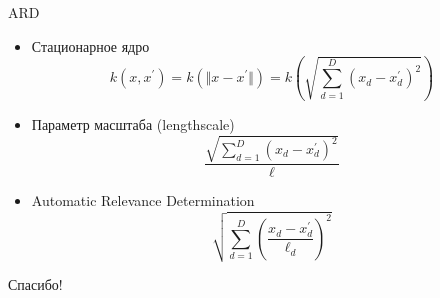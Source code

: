 \documentclass[fullscreen=true, bookmarks=true, hyperref={pdfencoding=unicode}]{beamer}
\begin{document}
\begin{frame}{}

\end{frame}

\begin{frame}{ARD}

    \begin{itemize}
        \item<1-> Стационарное ядро
        \[
        k(x, x^\prime) = k(\Vert x - x^\prime \Vert) = k\left(\sqrt{\sum_{d=1}^{D} (x_d - x^\prime_d)^2} \right)
        \]
        \item<2-> Параметр масштаба (lengthscale)
        \[
            \frac{\sqrt{\sum_{d=1}^{D} (x_d - x^\prime_d)^2}}{\ell}
        \]
        \item<3-> Automatic Relevance Determination
        \[
            \sqrt{\sum_{d=1}^{D} \left( \frac{x_d - x^\prime_d}{\ell_{d}} \right)^2 }
        \]
    \end{itemize}

\end{frame}

\begin{frame}{}
    \centerline{Спасибо!}
\end{frame}
\end{document}
